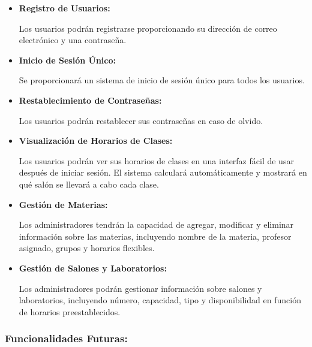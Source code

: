\begin{itemize}

        \item {
              \textbf{Registro de Usuarios:}

              Los usuarios podrán registrarse proporcionando su dirección de correo electrónico y una contraseña.
              }

        \item {

              \textbf{Inicio de Sesión Único:}

              Se proporcionará un sistema de inicio de sesión único para todos los usuarios.
              }

            \item {
                  \textbf{Restablecimiento de Contraseñas:}

              Los usuarios podrán restablecer sus contraseñas en caso de olvido.
            }

        \item {
              \textbf{Visualización de Horarios de Clases:}

              Los usuarios podrán ver sus horarios de clases en una interfaz fácil de usar después de iniciar sesión.
              El sistema calculará automáticamente y mostrará en qué salón se llevará a cabo cada clase.
              }

        \item {
              \textbf{Gestión de Materias:}

              Los administradores tendrán la capacidad de agregar, modificar y eliminar información sobre las materias, incluyendo nombre de la materia, profesor asignado, grupos y horarios flexibles.
              }

        \item {
              \textbf{Gestión de Salones y Laboratorios:}

              Los administradores podrán gestionar información sobre salones y laboratorios, incluyendo número, capacidad, tipo y disponibilidad en función de horarios preestablecidos.
              }

\end{itemize}

\subsubsection{Funcionalidades Futuras:}


